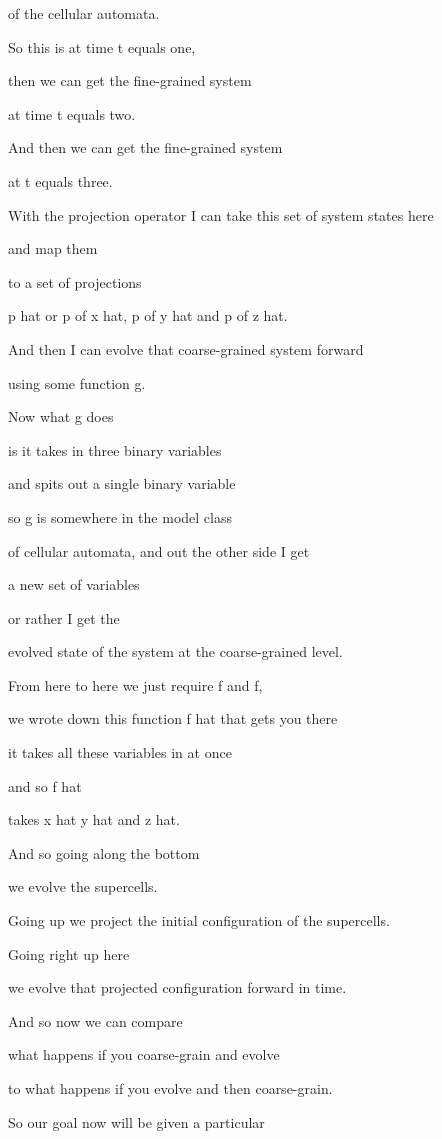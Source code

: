 \documentclass[]{article}
\begin{document}
of the cellular automata.

So this is at time t equals one,

then we can get the fine-grained system

at time t equals two.

And then we can get the fine-grained system

at t equals three.

With the projection operator
I can take this set of system states here

and map them

to a set of projections

p hat or p of x hat,
p of y hat and p of z hat.

And then I can evolve that
coarse-grained system forward

using some function g.

Now what g does

is it takes in three binary variables

and spits out a single binary variable

so g is somewhere in the model class

of cellular automata,
and out the other side I get

a new set of variables

or rather I get the

evolved state of the system at the coarse-grained level.

From here to here we just require f and f,

we wrote down this
function f hat that gets you there

it takes all these variables in at once

and so f hat

takes x hat y hat and z hat.

And so going along the bottom

we evolve the supercells.

Going up we project the initial
configuration of the supercells.

Going right up here

we evolve that projected configuration forward in time.

And so now we can compare

what happens if you
coarse-grain and evolve

to what happens if you
evolve and then coarse-grain.

So our goal now will be given a particular
\end{document}

